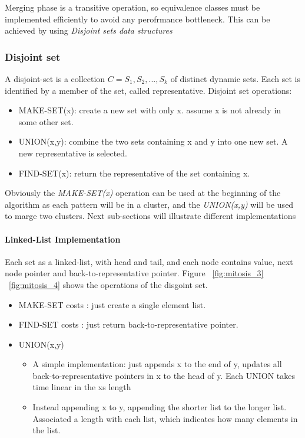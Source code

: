 Merging phase is a transitive operation, so equivalence classes must be implemented efficiently to avoid any perofrmance bottleneck.
This can be achieved by using \textit{Disjoint sets data structures}
\subsubsection{Disjoint set}

A disjoint-set is a collection $C={S_1, S_2,..., S_k}$ of distinct dynamic sets.
Each set is identified by a member of the set, called representative.
Disjoint set operations:
\begin{itemize}
\item MAKE-SET(x): create a new set with only x. assume x is not already in some other set.
\item UNION(x,y): combine the two sets containing x and y into one new set. A new representative is selected.
\item FIND-SET(x): return the representative of the set containing x.
\end{itemize}
Obviously the \textit{MAKE-SET(x)} operation can be used at the beginning of the algorithm as each pattern will be in a cluster, and the \textit{UNION(x,y)} will be used to marge two clusters.
Next sub-sections will illustrate different implementations
\paragraph{Linked-List Implementation}
Each set as a linked-list, with head and tail, and each node contains value, next node pointer and back-to-representative pointer.
Figure ~\ref{fig:mitosis_3} ~\ref{fig:mitosis_4} shows the operations of the disgoint set.
\begin{itemize}
\item MAKE-SET costs : just create a single element list.
\item FIND-SET costs : just return back-to-representative pointer.
\item {UNION(x,y) 
\begin{itemize}
\item {A simple implementation: just appends x to the end of y, updates all back-to-representative pointers in x to the head of y.
Each UNION takes time linear in the xs length}
\item {Instead appending x to y, appending the shorter list to the longer list.
Associated a length with each list, which indicates how many elements in the list.
}
\end{itemize}
}
\end{itemize}

